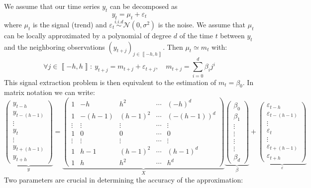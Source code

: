 \documentclass[
  12pt,
  ,
  a4paper]{article}
\newcommand\1{\mathds{1}}
\begin{document}
We assume that our time series \(y_t\) can be decomposed as
\[
y_t=\mu_t+\varepsilon_t
\]
where \(\mu_t\) is the signal (trend) and \(\varepsilon_{t}\overset{i.i.d}{\sim}\mathcal{N}(0,\sigma^{2})\) is the noise.
We assume that \(\mu_t\) can be locally approximated by a polynomial of degree \(d\) of the time \(t\) between \(y_t\) and the neighboring observations \(\left(y_{t+j}\right)_{j\in\left\llbracket -h,h\right\rrbracket}\). Then \(\mu_t\simeq m_{t}\) with:
\[
\forall j\in\left\llbracket -h,h\right\rrbracket :\:
y_{t+j}=m_{t+j}+\varepsilon_{t+j},\quad m_{t+j}=\sum_{i=0}^{d}\beta_{i}j^{i}
\]
This signal extraction problem is then equivalent to the estimation of \(m_t=\beta_0\). In matrix notation we can write:
\[
\underbrace{\begin{pmatrix}y_{t-h}\\
y_{t-(h-1)}\\
\vdots\\
y_{t}\\
\vdots\\
y_{t+(h-1)}\\
y_{t+h}
\end{pmatrix}}_{y}=\underbrace{\begin{pmatrix}1 & -h & h^{2} & \cdots & (-h)^{d}\\
1 & -(h-1) & (h-1)^{2} & \cdots & (-(h-1))^{d}\\
\vdots & \vdots & \vdots & \cdots & \vdots\\
1 & 0 & 0 & \cdots & 0\\
\vdots & \vdots & \vdots & \cdots & \vdots\\
1 & h-1 & (h-1)^{2} & \cdots & (h-1)^{d}\\
1 & h & h^{2} & \cdots & h^{d}
\end{pmatrix}}_{X}\underbrace{\begin{pmatrix}\beta_{0}\\
\beta_{1}\\
\vdots\\
\vdots\\
\vdots\\
\vdots\\
\beta_{d}
\end{pmatrix}}_{\beta}+\underbrace{\begin{pmatrix}\varepsilon_{t-h}\\
\varepsilon_{t-(h-1)}\\
\vdots\\
\varepsilon_{t}\\
\vdots\\
\varepsilon_{t+(h-1)}\\
\varepsilon_{t+h}
\end{pmatrix}}_{\varepsilon}
\]
Two parameters are crucial in determining the accuracy of the approximation:
\end{document}
